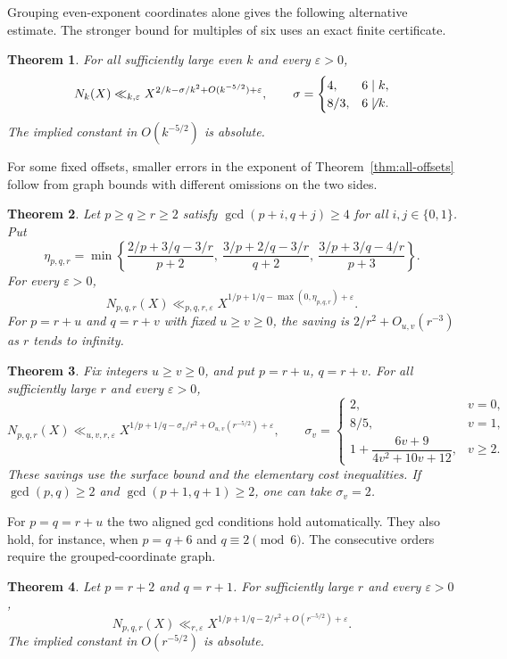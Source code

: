\documentclass[11pt,reqno]{amsart}
\newtheorem{theorem}{Theorem}
\newcommand{\eps}{\varepsilon}
\begin{document}
Grouping even-exponent coordinates alone gives the following
alternative estimate. The stronger bound for multiples of
six uses an exact finite certificate.

\begin{theorem}\label{thm:even-diagonal}
For all sufficiently large even \(k\) and every \(\eps>0\),
\[
 N_k(X)\ll_{k,\eps} X^{2/k-\sigma/k^2+O(k^{-5/2})+\eps},
 \qquad
 \sigma=\begin{cases}
 4,&6\mid k,\\
 8/3,&6\not\mid k .
 \end{cases}
\]
The implied constant in \(O(k^{-5/2})\) is absolute.
\end{theorem}

For some fixed offsets, smaller errors in the exponent of
Theorem~\ref{thm:all-offsets} follow from graph bounds with
different omissions on the two sides.

\begin{theorem}\label{thm:mixed-campana}
Let \(p\ge q\ge r\ge2\) satisfy
\(\gcd(p+i,q+j)\ge4\) for all \(i,j\in\{0,1\}\). Put
\[
 \eta_{p,q,r}=\min\left\{
 \frac{2/p+3/q-3/r}{p+2},\
 \frac{3/p+2/q-3/r}{q+2},\
 \frac{3/p+3/q-4/r}{p+3}\right\}.
\]
For every \(\eps>0\),
\[
 N_{p,q,r}(X)\ll_{p,q,r,\eps}
 X^{1/p+1/q-\max(0,\eta_{p,q,r})+\eps}.
\]
For \(p=r+u\) and \(q=r+v\) with fixed \(u\ge v\ge0\), the saving
is \(2/r^2+O_{u,v}(r^{-3})\) as \(r\) tends to infinity.
\end{theorem}

\begin{theorem}\label{thm:fixed-offset}
Fix integers \(u\ge v\ge0\), and put \(p=r+u\), \(q=r+v\).
For all sufficiently large \(r\) and every \(\eps>0\),
\[
 N_{p,q,r}(X)\ll_{u,v,r,\eps}
 X^{1/p+1/q-\sigma_v/r^2+O_{u,v}(r^{-5/2})+\eps},
 \qquad
 \sigma_v=
 \begin{cases}
 2,&v=0,\\
 8/5,&v=1,\\
 1+\dfrac{6v+9}{4v^2+10v+12},&v\ge2.
 \end{cases}
\]
These savings use the surface bound and the elementary cost
inequalities. If \(\gcd(p,q)\ge2\) and \(\gcd(p+1,q+1)\ge2\),
one can take \(\sigma_v=2\).
\end{theorem}

For \(p=q=r+u\) the two aligned gcd conditions hold automatically.
They also hold, for instance, when \(p=q+6\) and \(q\equiv2\pmod6\).
The consecutive orders require the grouped-coordinate graph.

\begin{theorem}\label{thm:consecutive}
Let \(p=r+2\) and \(q=r+1\). For sufficiently large \(r\) and
every \(\eps>0\),
\[
 N_{p,q,r}(X)\ll_{r,\eps}
 X^{1/p+1/q-2/r^2+O(r^{-5/2})+\eps}.
\]
The implied constant in \(O(r^{-5/2})\) is absolute.
\end{theorem}
\end{document}
